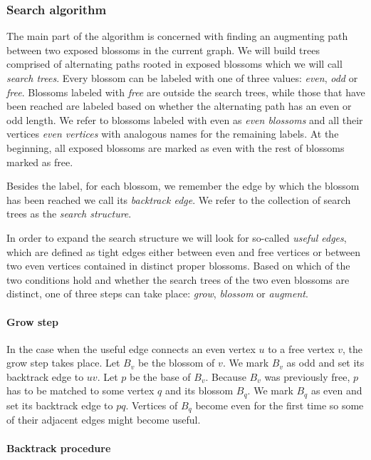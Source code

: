 \subsubsection{Search algorithm}

The main part of the algorithm is concerned with finding an augmenting path between two exposed blossoms in the current graph. We will build trees comprised of alternating paths rooted in exposed blossoms which we will call \textit{search trees}. Every blossom can be labeled with one of three values: \textit{even}, \textit{odd} or \textit{free}. Blossoms labeled with \textit{free} are outside the search trees, while those that have been reached are labeled based on whether the alternating path has an even or odd length. We refer to blossoms labeled with even as \textit{even blossoms} and all their vertices \textit{even vertices} with analogous names for the remaining labels. At the beginning, all exposed blossoms are marked as even with the rest of blossoms marked as free.

Besides the label, for each blossom, we remember the edge by which the blossom has been reached we call its \textit{backtrack edge}. We refer to the collection of search trees as the \textit{search structure}.

In order to expand the search structure we will look for so-called \textit{useful edges}, which are defined as tight edges either between even and free vertices or between two even vertices contained in distinct proper blossoms. Based on which of the two conditions hold and whether the search trees of the two even blossoms are distinct, one of three steps can take place: \textit{grow}, \textit{blossom} or \textit{augment}.

\paragraph*{Grow step}

In the case when the useful edge connects an even vertex $u$ to a free vertex $v$, the grow step takes place. Let $B_v$ be the blossom of $v$. We mark $B_v$ as odd and set its backtrack edge to $uv$. Let $p$ be the base of $B_v$. Because $B_v$ was previously free, $p$ has to be matched to some vertex $q$ and its blossom $B_q$. We mark $B_q$ as even and set its backtrack edge to $pq$. Vertices of $B_q$ become even for the first time so some of their adjacent edges might become useful.

\paragraph*{Backtrack procedure}

